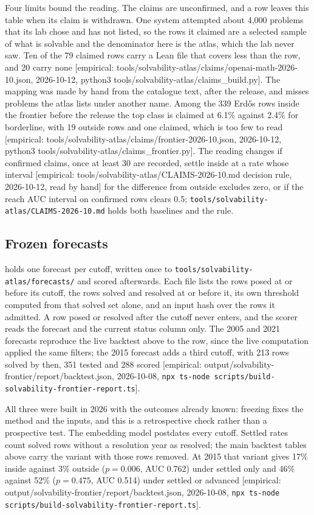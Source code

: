 \documentclass[11pt]{article}
\newcommand{\emp}[1]{\textcolor{bucketgray}{\footnotesize [empirical: #1]}}
\newcommand{\cmd}{\texttt{npx ts-node scripts/build-solvability-frontier-report.ts}}
\newcommand{\bt}{\emp{output/solvability-frontier/report/backtest.json, 2026-10-08, \cmd}}
\newcommand{\cl}{\emp{tools/solvability-atlas/claims/frontier-2026-10.json, 2026-10-12, python3 tools/solvability-atlas/claims\_frontier.py}}
\newcommand{\ldg}{\emp{tools/solvability-atlas/claims/openai-math-2026-10.json, 2026-10-12, python3 tools/solvability-atlas/claims\_build.py}}
\begin{document}
Four limits bound the reading. The claims are unconfirmed, and a row leaves this table when its claim is withdrawn. One system attempted about 4,000 problems that its lab chose and has not listed, so the rows it claimed are a selected sample of what is solvable and the denominator here is the atlas, which the lab never saw. Ten of the 79 claimed rows carry a Lean file that covers less than the row, and 20 carry none \ldg. The mapping was made by hand from the catalogue text, after the release, and misses problems the atlas lists under another name. Among the 339 Erd\H{o}s rows inside the frontier before the release the top class is claimed at 6.1\% against 2.4\% for borderline, with 19 outside rows and one claimed, which is too few to read \cl. The reading changes if confirmed claims, once at least 30 are recorded, settle inside at a rate whose interval \emp{tools/solvability-atlas/CLAIMS-2026-10.md decision rule, 2026-10-12, read by hand} for the difference from outside excludes zero, or if the reach AUC interval on confirmed rows clears 0.5; \texttt{tools/solvability-atlas/CLAIMS-2026-10.md} holds both baselines and the rule.

\subsection{Frozen forecasts}
\label{sec:frozen}

 holds one forecast per cutoff, written once to \texttt{tools/solvability-atlas/forecasts/} and scored afterwards. Each file lists the rows posed at or before its cutoff, the rows solved and resolved at or before it, its own threshold computed from that solved set alone, and an input hash over the rows it admitted. A row posed or resolved after the cutoff never enters, and the scorer reads the forecast and the current status column only. The 2005 and 2021 forecasts reproduce the live backtest above to the row, since the live computation applied the same filters; the 2015 forecast adds a third cutoff, with 213 rows solved by then, 351 tested and 288 scored \bt.

All three were built in 2026 with the outcomes already known: freezing fixes the method and the inputs, and this is a retrospective check rather than a prospective test. The embedding model postdates every cutoff. Settled rates count solved rows without a resolution year as resolved; the main backtest tables above carry the variant with those rows removed. At 2015 that variant gives 17\% inside against 3\% outside ($p=0.006$, AUC 0.762) under settled only and 46\% against 52\% ($p=0.475$, AUC 0.514) under settled or advanced \bt.
\end{document}
